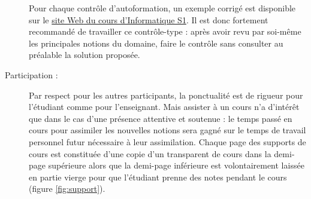 \begin{description}
	Pour chaque contrôle d'autoformation, un exemple corrigé est
	disponible sur le 
	\href{https://moodle.enib.fr/course/view.php?id=24}{site {\sc Web} du cours d'Informatique S1}. 
	Il est donc fortement 
	recommandé de travailler ce contrôle-type : après avoir revu
	par soi-même les principales notions du domaine, faire
	le contrôle sans consulter au préalable la solution proposée. 
	
\item[Participation :]  
	Par respect pour les autres participants, 
	la ponctualité est de rigueur pour l'étudiant comme pour l'enseignant.
	\marginpar{\footnotesize\em
	}
	Mais assister à un cours n'a d'intérêt que dans le cas d'une 
	présence attentive et soutenue : le temps passé en cours 
	pour assimiler les nouvelles notions sera gagné sur le temps de
	travail personnel futur nécessaire à leur assimilation.
	Chaque page des supports de cours est constituée
	d'une copie d'un transparent de cours dans la demi-page supérieure
	alors que la demi-page inférieure est volontairement laissée en partie vierge
	pour que l'étudiant prenne des notes pendant le cours (figure \ref{fig:support}).


\end{description}
